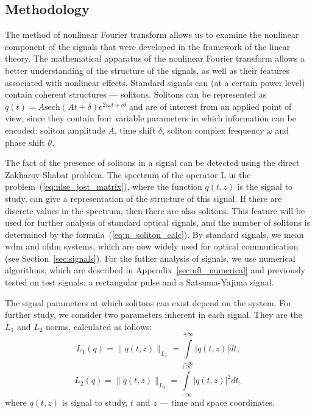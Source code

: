\subsection{Methodology}
\label{sec:soliton_method}

The method of nonlinear Fourier transform allows us to examine the nonlinear component of the signals that were developed in the framework of the linear theory.
The mathematical apparatus of the nonlinear Fourier transform allows a better understanding of the structure of the signals, as well as their features associated with nonlinear effects.
Standard signals can (at a certain power level) contain coherent structures — solitons. Solitons can be represented as $q(t) = A \mathrm{sech} (At + \delta) e^{2 i \omega t + i \theta}$ and are of interest from an applied point of view, since they contain four variable parameters in which information can be encoded: 
soliton amplitude $A$, time shift $\delta$, soliton complex frequency $\omega$ and phase shift $\theta$. 

The fact of the presence of solitons in a signal can be detected using the 
direct Zakharov-Shabat problem. The spectrum of the operator 
L in the problem~(\ref{eq:nlse_jost_matrix}), where the function $q (t, z)$ 
is the signal to study, can give a representation of the structure of this signal. 
If there are discrete values in the spectrum, then there are also solitons. 
This feature will be used for further analysis of standard optical signals, 
and the number of solitons is determined by the formula~(\ref{eq:n_soliton_calc}). 
By standard signals, we mean \acrshort{wdm} and \acrshort{ofdm} systems, which are now widely used for optical communication (see Section~\ref{sec:signals}).
For the futher analysis of signals, we use numerical algorithms, 
which are described in Appendix~\ref{sec:nft_numerical} 
and previously tested on test signals: a rectangular pulse and a Satsuma-Yajima signal.



The signal parameters at which solitons can exist depend on the system.
For further study, we consider two parameters inherent in each signal. 
They are the $L_1$ and $L_2$ norms, calculated as follows:
\begin{equation}
    L_1(q) = \| q(t,z) \|_{L_1} = \int\limits_{-\infty}^{+\infty} |q(t,z)| dt {,}
    \label{eq:l1_n}
\end{equation}
\begin{equation}
    L_2(q) = \| q(t,z) \|_{L_2} = \int\limits_{-\infty}^{+\infty} |q(t,z)|^2 dt {,}
    \label{eq:l2_n}
\end{equation}
where $q(t,z)$ is signal to study, $t$ and $z$ --- time and space coordinates.



